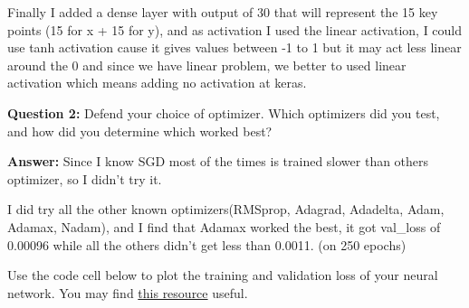 \documentclass[11pt]{article}
\begin{document}
Finally I added a dense layer with output of 30 that will represent the
15 key points (15 for x + 15 for y), and as activation I used the linear
activation, I could use tanh activation cause it gives values between -1
to 1 but it may act less linear around the 0 and since we have linear
problem, we better to used linear activation which means adding no
activation at keras.

\textbf{Question 2:} Defend your choice of optimizer. Which optimizers
did you test, and how did you determine which worked best?

\textbf{Answer:} Since I know SGD most of the times is trained slower
than others optimizer, so I didn't try it.

I did try all the other known optimizers(RMSprop, Adagrad, Adadelta,
Adam, Adamax, Nadam), and I find that Adamax worked the best, it got
val\_loss of 0.00096 while all the others didn't get less than 0.0011.
(on 250 epochs)

Use the code cell below to plot the training and validation loss of your
neural network. You may find
\href{http://machinelearningmastery.com/display-deep-learning-model-training-history-in-keras/}{this
resource} useful.
\end{document}
